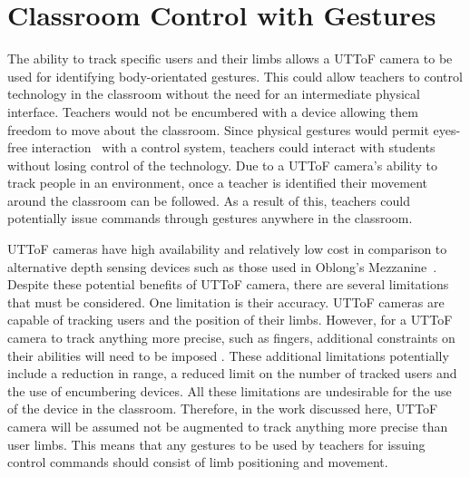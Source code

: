 \documentclass[manuscript, review, screen]{acmart}
\begin{document}

\section{Classroom Control with Gestures}  
\label{sec:classcontrol}

The ability to track specific users and their limbs allows a \ac{UTToF} camera to be used for identifying body-orientated gestures.
This could allow teachers to control technology in the classroom without the need for an intermediate physical interface.
Teachers would not be encumbered with a device allowing them freedom to move about the classroom.
Since physical gestures would permit eyes-free interaction~\cite{Brewster2003} with a control system, teachers could interact with students without losing control of the technology.
Due to a \ac{UTToF} camera's ability to track people in an environment, once a teacher is identified their movement around the classroom can be followed.
As a result of this, teachers could potentially issue commands through gestures anywhere in the classroom.

\ac{UTToF} cameras have high availability and relatively low cost in comparison to alternative depth sensing devices such as those used in Oblong's Mezzanine~\cite{kramer2011}.
Despite these potential benefits of \ac{UTToF} camera, there are several limitations that must be considered.
One limitation is their accuracy.
\ac{UTToF} cameras are capable of tracking users and the position of their limbs.
However, for a \ac{UTToF} camera to track anything more precise, such as fingers, additional constraints on their abilities will need to be imposed \cite{Clark2011}.
These additional limitations potentially include a reduction in range, a reduced limit on the number of tracked users and the use of encumbering devices.
All these limitations are undesirable for the use of the device in the classroom.
Therefore, in the work discussed here, \ac{UTToF} camera will be assumed not be augmented to track anything more precise than user limbs.
This means that any gestures to be used by teachers for issuing control commands should consist of limb positioning and movement.
\end{document}
